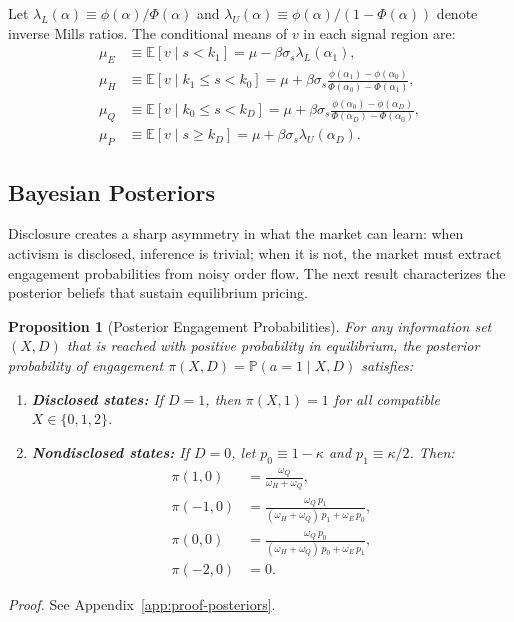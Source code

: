 \documentclass[11pt]{article}
\newtheorem{proposition}{Proposition}
\newcommand{\E}{\mathbb{E}}
\newcommand{\PP}{\mathbb{P}}
\newcommand{\1}{\mathbf{1}}
\begin{document}
Let $\lambda_L(\alpha) \equiv \phi(\alpha)/\Phi(\alpha)$ and $\lambda_U(\alpha) \equiv \phi(\alpha)/(1-\Phi(\alpha))$ denote inverse Mills ratios. The conditional means of $v$ in each signal region are:
\begin{align*}
\mu_E &\equiv \E[v \mid s < k_1] = \mu - \beta\sigma_s \lambda_L(\alpha_1), \\
\mu_H &\equiv \E[v \mid k_1 \leq s < k_0] = \mu + \beta\sigma_s \frac{\phi(\alpha_1) - \phi(\alpha_0)}{\Phi(\alpha_0) - \Phi(\alpha_1)}, \\
\mu_Q &\equiv \E[v \mid k_0 \leq s < k_D] = \mu + \beta\sigma_s \frac{\phi(\alpha_0) - \phi(\alpha_D)}{\Phi(\alpha_D) - \Phi(\alpha_0)}, \\
\mu_P &\equiv \E[v \mid s \geq k_D] = \mu + \beta\sigma_s \lambda_U(\alpha_D).
\end{align*}

%
\subsection{Bayesian Posteriors}
%

Disclosure creates a sharp asymmetry in what the market can learn: when activism is disclosed, inference is trivial; when it is not, the market must extract engagement probabilities from noisy order flow. The next result characterizes the posterior beliefs that sustain equilibrium pricing.

\begin{proposition}[Posterior Engagement Probabilities]
\label{prop:posteriors}
For any information set $(X,D)$ that is reached with positive probability in equilibrium, the posterior probability of engagement $\pi(X,D) = \PP(a=1 \mid X, D)$ satisfies:
\begin{enumerate}[label=(\alph*)]
\item \textbf{Disclosed states:} If $D = 1$, then $\pi(X, 1) = 1$ for all compatible $X \in \{0, 1, 2\}$.
\item \textbf{Nondisclosed states:} If $D = 0$, let $p_0 \equiv 1 - \kappa$ and $p_1 \equiv \kappa/2$. Then:
\begin{align*}
\pi(1, 0) &= \frac{\omega_Q}{\omega_H + \omega_Q}, \\
\pi(-1, 0) &= \frac{\omega_Q \, p_1}{(\omega_H + \omega_Q) \, p_1 + \omega_E \, p_0}, \\
\pi(0, 0) &= \frac{\omega_Q \, p_0}{(\omega_H + \omega_Q) \, p_0 + \omega_E \, p_1}, \\
\pi(-2, 0) &= 0.
\end{align*}
\end{enumerate}
\end{proposition}
\textit{Proof.} See Appendix~\ref{app:proof-posteriors}.
\end{document}
